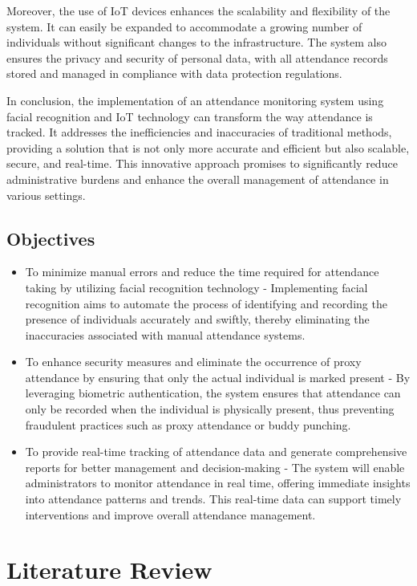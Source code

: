 \documentclass[12pt,a4paper]{report}
\begin{document}
\par Moreover, the use of IoT devices enhances the scalability and flexibility of the system. It can easily be expanded to accommodate a growing number of individuals without significant changes to the infrastructure. The system also ensures the privacy and security of personal data, with all attendance records stored and managed in compliance with data protection regulations.\\
\par In conclusion, the implementation of an attendance monitoring system using facial recognition and IoT technology can transform the way attendance is tracked. It addresses the inefficiencies and inaccuracies of traditional methods, providing a solution that is not only more accurate and efficient but also scalable, secure, and real-time. This innovative approach promises to significantly reduce administrative burdens and enhance the overall management of attendance in various settings.

\section{Objectives}
\begin{itemize}
	\item To minimize manual errors and reduce the time required for attendance taking by utilizing facial recognition technology - Implementing facial recognition aims to automate the process of identifying and recording the presence of individuals accurately and swiftly, thereby eliminating the inaccuracies associated with manual attendance systems.
	\item To enhance security measures and eliminate the occurrence of proxy attendance by ensuring that only the actual individual is marked present - By leveraging biometric authentication, the system ensures that attendance can only be recorded when the individual is physically present, thus preventing fraudulent practices such as proxy attendance or buddy punching.
	\item To provide real-time tracking of attendance data and generate comprehensive reports for better management and decision-making - The system will enable administrators to monitor attendance in real time, offering immediate insights into attendance patterns and trends. This real-time data can support timely interventions and improve overall attendance management.
\end{itemize}

\chapter{Literature Review}
\end{document}
